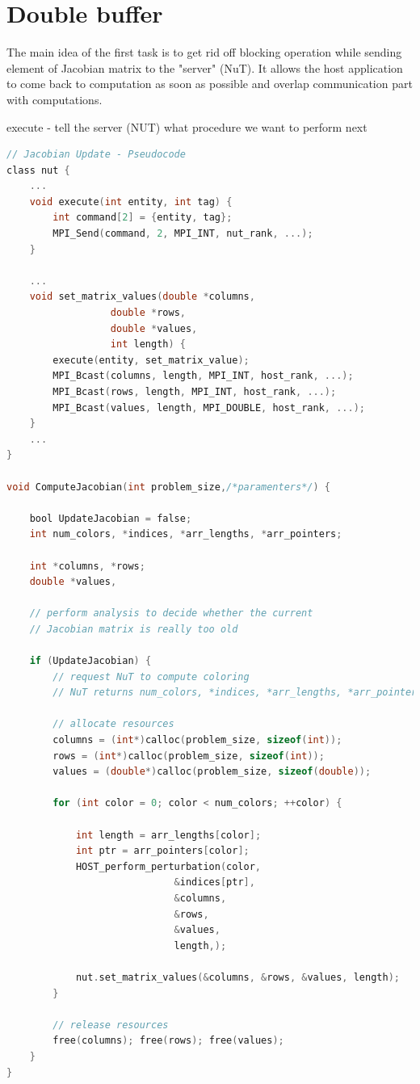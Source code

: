 \chapter{Double buffer}\label{chapter:Double buffer}

The main idea of the first task is to get rid off blocking operation while sending element of Jacobian matrix to the "server" (NuT). It allows the host application to come back to computation as soon as possible and overlap communication part with computations.\par
execute - tell the server (NUT) what procedure we want to perform next
\begin{lstlisting}[language=C]
// Jacobian Update - Pseudocode
class nut {
	...
	void execute(int entity, int tag) {
		int command[2] = {entity, tag};
		MPI_Send(command, 2, MPI_INT, nut_rank, ...);
	}
	
	...
	void set_matrix_values(double *columns,
				  double *rows,
				  double *values,
				  int length) {
		execute(entity, set_matrix_value);
		MPI_Bcast(columns, length, MPI_INT, host_rank, ...);
		MPI_Bcast(rows, length, MPI_INT, host_rank, ...);
		MPI_Bcast(values, length, MPI_DOUBLE, host_rank, ...);
	}
	...
}

void ComputeJacobian(int problem_size,/*paramenters*/) {

	bool UpdateJacobian = false;
	int num_colors, *indices, *arr_lengths, *arr_pointers;
	
	int *columns, *rows;
	double *values,
		
	// perform analysis to decide whether the current
	// Jacobian matrix is really too old

	if (UpdateJacobian)	{
		// request NuT to compute coloring
		// NuT returns num_colors, *indices, *arr_lengths, *arr_pointers
		
		// allocate resources
		columns = (int*)calloc(problem_size, sizeof(int));
		rows = (int*)calloc(problem_size, sizeof(int));
		values = (double*)calloc(problem_size, sizeof(double));
		
		for (int color = 0; color < num_colors; ++color) {
		
			int length = arr_lengths[color];
			int ptr = arr_pointers[color];
			HOST_perform_perturbation(color,
						     &indices[ptr],
						     &columns,
						     &rows,
						     &values,
						     length,);
						     
			nut.set_matrix_values(&columns, &rows, &values, length);
		}
		
		// release resources
		free(columns); free(rows); free(values);
	} 
}
\end{lstlisting}


